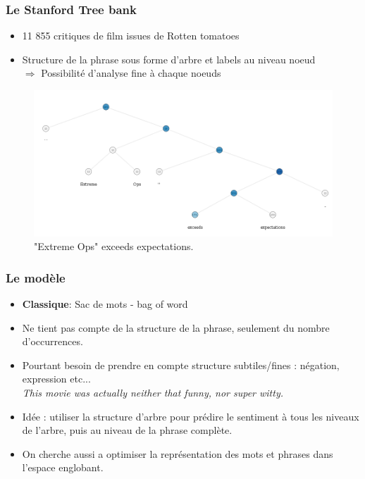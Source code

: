 \documentclass{beamer}
\begin{document}

\begin{frame}
\frametitle{Le Stanford Tree bank}
\begin{itemize}\setlength{\itemsep}{5mm}
\item 11 855 critiques de film issues de Rotten tomatoes
\item Structure de la phrase sous forme d'arbre et labels au niveau noeud\\
$\Rightarrow$ Possibilité d'analyse fine à chaque noeuds
\end{itemize}

\begin{figure}[htp]
\centering
\includegraphics[scale=0.2]{fig/Tree10.png}
\caption{"Extreme Ops" exceeds expectations.}
\end{figure}

\end{frame}


\begin{frame}
\frametitle{Le modèle}
\begin{itemize}\setlength{\itemsep}{7mm}
\item \textbf{Classique}: Sac de mots - bag of word 
\item Ne tient pas compte de la structure de la phrase, seulement du nombre d'occurrences. 
\item Pourtant besoin de prendre en compte structure subtiles/fines : négation, expression etc...\\
\emph{This movie was actually neither that funny, nor super witty.}
\item Idée : utiliser la structure d'arbre pour prédire le sentiment à tous les niveaux de l'arbre, puis au niveau de la phrase complète.
\item On cherche aussi a optimiser la représentation des mots et phrases dans l'espace englobant.
\end{itemize}

\end{frame}
\end{document}
